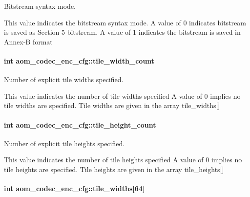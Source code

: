Bitstream syntax mode. 

This value indicates the bitstream syntax mode. A value of 0 indicates bitstream is saved as Section 5 bitstream. A value of 1 indicates the bitstream is saved in Annex-\/B format 
\paragraph[{\texorpdfstring{tile\+\_\+width\+\_\+count}{tile_width_count}}]{\setlength{\rightskip}{0pt plus 5cm}int aom\+\_\+codec\+\_\+enc\+\_\+cfg\+::tile\+\_\+width\+\_\+count}\hypertarget{structaom__codec__enc__cfg_a1b1fc8284e9a26deb875b1b2a58e47d9}{}\label{structaom__codec__enc__cfg_a1b1fc8284e9a26deb875b1b2a58e47d9}


Number of explicit tile widths specified. 

This value indicates the number of tile widths specified A value of 0 implies no tile widths are specified. Tile widths are given in the array tile\+\_\+widths\mbox{[}\mbox{]} 
\paragraph[{\texorpdfstring{tile\+\_\+height\+\_\+count}{tile_height_count}}]{\setlength{\rightskip}{0pt plus 5cm}int aom\+\_\+codec\+\_\+enc\+\_\+cfg\+::tile\+\_\+height\+\_\+count}\hypertarget{structaom__codec__enc__cfg_aefb0569c7e68dd865067417145d39a0c}{}\label{structaom__codec__enc__cfg_aefb0569c7e68dd865067417145d39a0c}


Number of explicit tile heights specified. 

This value indicates the number of tile heights specified A value of 0 implies no tile heights are specified. Tile heights are given in the array tile\+\_\+heights\mbox{[}\mbox{]} 
\paragraph[{\texorpdfstring{tile\+\_\+widths}{tile_widths}}]{\setlength{\rightskip}{0pt plus 5cm}int aom\+\_\+codec\+\_\+enc\+\_\+cfg\+::tile\+\_\+widths\mbox{[}64\mbox{]}}\hypertarget{structaom__codec__enc__cfg_ab03c0c96d42faaa8a3d697d4d283afcf}{}\label{structaom__codec__enc__cfg_ab03c0c96d42faaa8a3d697d4d283afcf}


